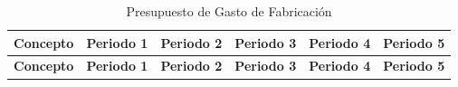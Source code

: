 \documentclass[
  stu,
  floatsintext,
  longtable,
  a4paper,
  nolmodern,
  notxfonts,
  notimes,
  colorlinks=true,linkcolor=blue,citecolor=blue,urlcolor=blue]{apa7}
\begin{document}
\begin{longtable}[]{@{}
  >{\raggedright\arraybackslash}p{}
  >{\centering\arraybackslash}p{}
  >{\centering\arraybackslash}p{}
  >{\centering\arraybackslash}p{}
  >{\centering\arraybackslash}p{}
  >{\centering\arraybackslash}p{}@{}}
\caption{Presupuesto de Gasto de Fabricación}\tabularnewline
\toprule\noalign{}
\begin{minipage}[b]{\linewidth}\raggedright
\textbf{Concepto}
\end{minipage} & \begin{minipage}[b]{\linewidth}\centering
\textbf{Periodo 1}
\end{minipage} & \begin{minipage}[b]{\linewidth}\centering
\textbf{Periodo 2}
\end{minipage} & \begin{minipage}[b]{\linewidth}\centering
\textbf{Periodo 3}
\end{minipage} & \begin{minipage}[b]{\linewidth}\centering
\textbf{Periodo 4}
\end{minipage} & \begin{minipage}[b]{\linewidth}\centering
\textbf{Periodo 5}
\end{minipage} \\
\midrule\noalign{}
\endfirsthead
\toprule\noalign{}
\begin{minipage}[b]{\linewidth}\raggedright
\textbf{Concepto}
\end{minipage} & \begin{minipage}[b]{\linewidth}\centering
\textbf{Periodo 1}
\end{minipage} & \begin{minipage}[b]{\linewidth}\centering
\textbf{Periodo 2}
\end{minipage} & \begin{minipage}[b]{\linewidth}\centering
\textbf{Periodo 3}
\end{minipage} & \begin{minipage}[b]{\linewidth}\centering
\textbf{Periodo 4}
\end{minipage} & \begin{minipage}[b]{\linewidth}\centering
\textbf{Periodo 5}
\end{minipage} \\

\end{longtable}
\end{document}
